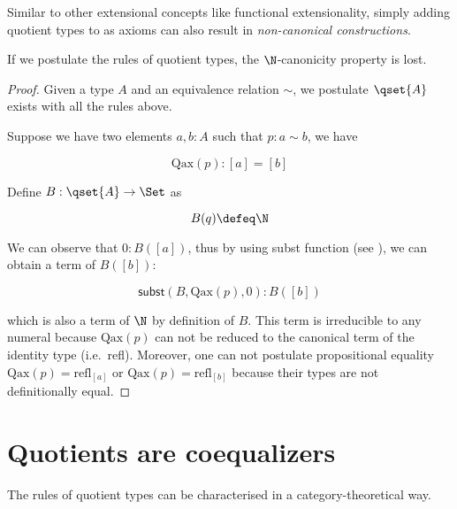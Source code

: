 




Similar to other extensional concepts like functional extensionality, simply adding quotient types to \itt as axioms can also result in \emph{non-canonical constructions}.

\begin{theorem}\label{quotientcanonicity}
If we postulate the rules of quotient types, the $\N$-canonicity property is lost.
\end{theorem}

\begin{proof}
Given a type $A$ and an equivalence relation $\sim$, we postulate $\qset{A}$ exists with all the rules above.

Suppose we have two elements $a, b : A$ such that $p : a \sim b$, we have

$$\text{Qax}(p) : [a] = [b]$$

Define $B : \qset{A} \to \Set$ as

$$B(q)\defeq \N$$

We can observe that $0 : B([a])$, thus by using subst function (see ), we can obtain a term of $B([b])$:

$$\mathsf{subst}(B,\text{Qax}(p),0) : B([b])$$

which is also a term of $\N$ by definition of $B$.
This term is irreducible to any numeral because $\text{Qax}(p)$ can not be reduced to the canonical term of the identity type (i.e.\ refl). 
Moreover, one can not postulate propositional equality $\text{Qax}(p) = \text{refl}_{[a]}$ or $\text{Qax}(p) = \text{refl}_{[b]}$ because their types are not definitionally equal.
\end{proof}

\section{Quotients are coequalizers}

The rules of quotient types can be characterised in a category-theoretical way.

